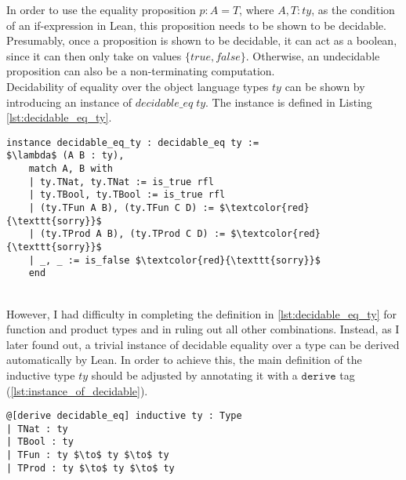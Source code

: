 \documentclass{article}
\newcommand{\tt}[1]{\texttt{#1}}
\begin{document}
In order to use the equality proposition $p : A = T$, where $A, T : ty$, as the condition of an if-expression in Lean, this proposition needs to be shown to be decidable. Presumably, once a proposition is shown to be decidable, it can act as a boolean, since it can then only take on values $\{true, false\}$. Otherwise, an undecidable proposition can also be a non-terminating computation. \\

Decidability of equality over the object language types $ty$ can be shown by introducing an instance of $decidable\_eq \; ty$. The instance is defined in Listing \ref{lst:decidable_eq_ty}. \\

\begin{minipage}{\textwidth}
\begin{lstlisting}[mathescape = true, caption={Instance of decidability of equlity of $ty$.}, captionpos=b, label={lst:decidable_eq_ty}]
instance decidable_eq_ty : decidable_eq ty :=
$\lambda$ (A B : ty),
    match A, B with
    | ty.TNat, ty.TNat := is_true rfl
    | ty.TBool, ty.TBool := is_true rfl
    | (ty.TFun A B), (ty.TFun C D) := $\textcolor{red}{\texttt{sorry}}$
    | (ty.TProd A B), (ty.TProd C D) := $\textcolor{red}{\texttt{sorry}}$
    | _, _ := is_false $\textcolor{red}{\texttt{sorry}}$
    end
\end{lstlisting}
\end{minipage} \\

However, I had difficulty in completing the definition in \ref{lst:decidable_eq_ty} for function and product types and in ruling out all other combinations. Instead, as I later found out, a trivial instance of decidable equality over a type can be derived automatically by Lean. In order to achieve this, the main definition of the inductive type $ty$ should be adjusted by annotating it with a $\tt{derive}$ tag (\ref{lst:instance_of_decidable}). \\

\begin{minipage}{\textwidth}
\begin{lstlisting}[mathescape = true, caption={Instance of decidability of equlity of $ty$ using {\tt{derive}} tag.}, captionpos=b, label={lst:instance_of_decidable}]
@[derive decidable_eq] inductive ty : Type
| TNat : ty
| TBool : ty
| TFun : ty $\to$ ty $\to$ ty
| TProd : ty $\to$ ty $\to$ ty
\end{lstlisting}
\end{minipage}
\end{document}
